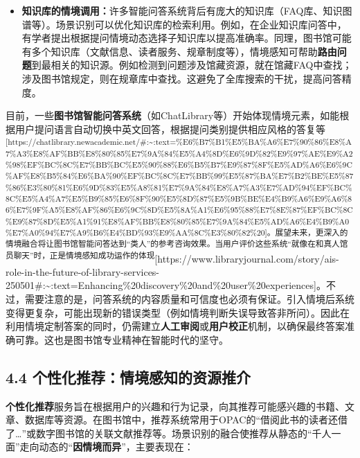 \documentclass[
  letterpaper,
]{scrbook}
\begin{document}
\begin{itemize}
\item
  \textbf{知识库的情境调用：}许多智能问答系统背后有庞大的知识库（FAQ库、知识图谱等）。场景识别可以优化知识库的检索利用。例如，在企业知识库问答中，有学者提出根据提问情境动态选择子知识库以提高准确率。同理，图书馆可能有多个知识库（文献信息、读者服务、规章制度等），情境感知可帮助\textbf{路由问题}到最相关的知识源。例如检测到问题涉及馆藏资源，就在馆藏FAQ中查找；涉及图书馆规定，则在规章库中查找。这避免了全库搜索的干扰，提高问答精度。
\end{itemize}

目前，一些\textbf{图书馆智能问答系统}（如ChatLibrary等）开始体现情境元素，如能根据用户提问语言自动切换中英文回答，根据提问类别提供相应风格的答复等\textsuperscript{{[}https://chatlibrary.newacademic.net/\#:\textasciitilde:text=\%E6\%B7\%B1\%E5\%BA\%A6\%E7\%90\%86\%E8\%A7\%A3\%E8\%AF\%BB\%E8\%80\%85\%E7\%9A\%84\%E5\%A4\%8D\%E6\%9D\%82\%E9\%97\%AE\%E9\%A2\%98\%EF\%BC\%8C\%E7\%BB\%BC\%E5\%90\%88\%E6\%B5\%B7\%E9\%87\%8F\%E5\%AD\%A6\%E6\%9C\%AF\%E8\%B5\%84\%E6\%BA\%90\%EF\%BC\%8C\%E7\%BB\%99\%E5\%87\%BA\%E7\%B2\%BE\%E5\%87\%86\%E3\%80\%81\%E6\%9D\%83\%E5\%A8\%81\%E7\%9A\%84\%E8\%A7\%A3\%E7\%AD\%94\%EF\%BC\%8C\%E5\%A4\%A7\%E5\%B9\%85\%E6\%8F\%90\%E5\%8D\%87\%E5\%9B\%BE\%E4\%B9\%A6\%E9\%A6\%86\%E7\%9F\%A5\%E8\%AF\%86\%E6\%9C\%8D\%E5\%8A\%A1\%E6\%95\%88\%E7\%8E\%87\%EF\%BC\%8C\%E9\%87\%8D\%E5\%A1\%91\%E8\%AF\%BB\%E8\%80\%85\%E7\%9A\%84\%E5\%AD\%A6\%E4\%B9\%A0\%E7\%A0\%94\%E7\%A9\%B6\%E4\%BD\%93\%E9\%AA\%8C\%E3\%80\%82\%20{]}。展望未来，更深入的情境融合将让图书馆智能问答达到``类人''的参考咨询效果。当用户评价这些系统``就像在和真人馆员聊天''时，正是情境感知成功运作的体现}{[}https://www.libraryjournal.com/story/ais-role-in-the-future-of-library-services-250501\#:\textasciitilde:text=Enhancing\%20discovery\%20and\%20user\%20experiences{]}。不过，需要注意的是，问答系统的内容质量和可信度也必须有保证。引入情境后系统变得更复杂，可能出现新的错误类型（例如情境判断失误导致答非所问）。因此在利用情境定制答案的同时，仍需建立\textbf{人工审阅}或\textbf{用户校正}机制，以确保最终答案准确可靠。这也是图书馆专业精神在智能时代的坚守。

\subsection{4.4
个性化推荐：情境感知的资源推介}\label{ux4e2aux6027ux5316ux63a8ux8350ux60c5ux5883ux611fux77e5ux7684ux8d44ux6e90ux63a8ux4ecb}

\textbf{个性化推荐}服务旨在根据用户的兴趣和行为记录，向其推荐可能感兴趣的书籍、文章、数据库等资源。在图书馆中，推荐系统常用于OPAC的``借阅此书的读者还借了\ldots''或数字图书馆的关联文献推荐等。场景识别的融合使推荐从静态的``千人一面''走向动态的``\textbf{因情境而异}''，主要表现在：
\end{document}
